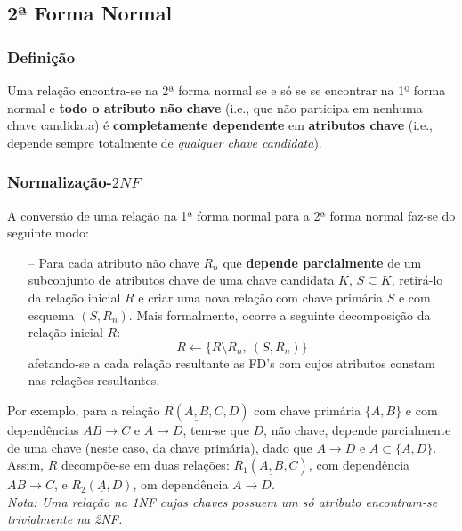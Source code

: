 \documentclass[oneside]{book}
\theoremstyle{definition}
\begin{document}
\subsection{2ª Forma Normal}

\subsubsection*{Definição}

Uma relação encontra-se na 2ª forma normal se e só se se encontrar na 1º forma normal e \textbf{todo o atributo não chave} (i.e., que não participa em nenhuma chave candidata) é \textbf{completamente dependente} em \textbf{atributos chave} (i.e., depende sempre totalmente de \textit{qualquer chave candidata}).

\subsubsection*{Normalização-$2NF$}

A conversão de uma relação na 1ª forma normal para a 2ª forma normal faz-se do seguinte modo:

\begin{itemize}
    \itemsep0cm
    \item[--] Para cada atributo não chave $R_n$ que \textbf{depende parcialmente} de um subconjunto de atributos chave de uma chave candidata $K$, $S \subseteq K$, retirá-lo da relação inicial $R$ e criar uma nova relação com chave primária $S$ e com esquema $(S, R_n)$. Mais formalmente, ocorre a seguinte decomposição da relação inicial $R$: 
    \[
        R \gets \{R \setminus R_n,\:  (S, R_n)\}
    \]
    afetando-se a cada relação resultante as FD's com cujos atributos constam nas relações resultantes.
\end{itemize}

Por exemplo, para a relação $R(\underline{A, B}, C, D)$ com chave primária $\{A, B\}$ e com dependências $AB \rightarrow C$ e $A \rightarrow D$, tem-se que $D$, não chave, depende parcialmente de uma chave (neste caso, da chave primária), dado que $A \rightarrow D$ e $A \subset \{A, D\}$. Assim, $R$ decompõe-se em duas relações: $R_1(\underline{A, B}, C)$, com dependência $AB \rightarrow C$, e $R_2(\underline{A}, D)$, om dependência $A \rightarrow D$.\\ 
\vspace*{0.3em}
\textit{Nota: Uma relação na 1NF cujas chaves possuem um só atributo encontram-se trivialmente na 2NF.}
\end{document}
